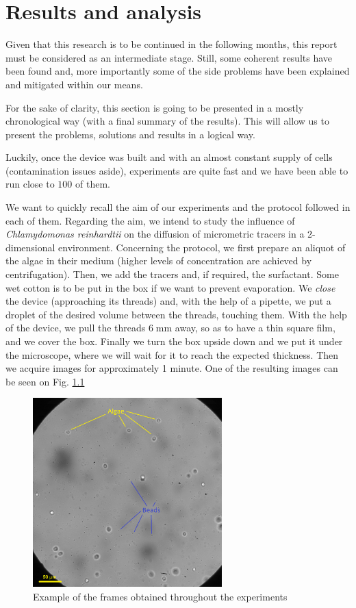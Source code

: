 \chapter{Results and analysis}
\label{results_analysis}

Given that this research is to be continued in the following months, this report must be considered as an intermediate stage. Still, some coherent results have been found and, more importantly some of the side problems have been explained and mitigated within our means.

For the sake of clarity, this section is going to be presented in a mostly chronological way (with a final summary of the results). This will allow us to present the problems, solutions and results in a logical way.

Luckily, once the device was built and with an almost constant supply of cells (contamination issues aside), experiments are quite fast and we have been able to run close to $100$ of them.

We want to quickly recall the aim of our experiments and the protocol followed in each of them. Regarding the aim, we intend to study the influence of \textit{Chlamydomonas reinhardtii} on the diffusion of micrometric tracers in a 2-dimensional environment. Concerning the protocol, we first prepare an aliquot of the algae in their medium (higher levels of concentration are achieved by centrifugation). Then, we add the tracers and, if required, the surfactant. Some wet cotton is to be put in the box if we want to prevent evaporation. We \textit{close} the device (approaching its threads) and, with the help of a pipette, we put a droplet of the desired volume between the threads, touching them. With the help of the device, we pull the threads $6 \; \textrm{mm}$ away, so as to have a thin square film, and we cover the box. Finally we turn the box upside down and we put it under the microscope, where we will wait for it to reach the expected thickness. Then we acquire images for approximately 1 minute. One of the resulting images can be seen on Fig. \ref{frame_e3}

\begin{figure}[H]
	\centering
	\includegraphics[width=0.65\textwidth]{archivos/e3_randomframe.png}
	\caption{Example of the frames obtained throughout the experiments}
	\label{frame_e3}
\end{figure}

